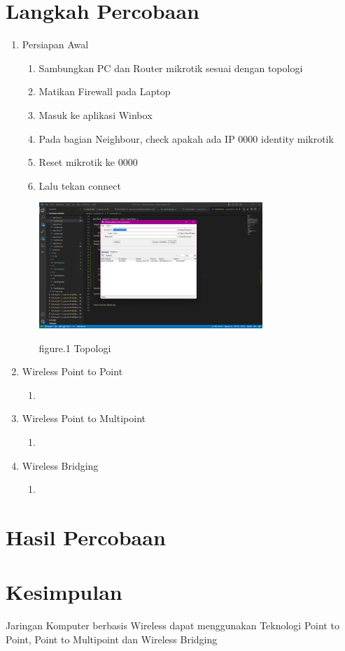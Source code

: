 \section{Langkah Percobaan}
\begin{enumerate}
    \item Persiapan Awal
    
    \begin{enumerate}
        \item Sambungkan PC dan Router mikrotik sesuai dengan topologi
        \item Matikan Firewall pada Laptop
        \item Masuk ke aplikasi Winbox
        \item Pada bagian Neighbour, check apakah ada IP 0000 identity mikrotik
        \item Reset mikrotik ke 0000
        \item Lalu tekan connect
        
        \begin{center}
            \includegraphics[width=0.7\textwidth]{image/Winbox-interface.png}    
            
            figure.1 Topologi
        \end{center}

    \end{enumerate}

    \item Wireless Point to Point
    
    \begin{enumerate}
        \item 
    \end{enumerate}

    \item Wireless Point to Multipoint
    
    \begin{enumerate}
        \item 
    \end{enumerate}

    \item Wireless Bridging
    
    \begin{enumerate}
        \item 
    \end{enumerate}
    
\end{enumerate}

\section{Hasil Percobaan}



\section{Kesimpulan}

Jaringan Komputer berbasis Wireless dapat menggunakan Teknologi Point to Point, Point to Multipoint dan Wireless Bridging